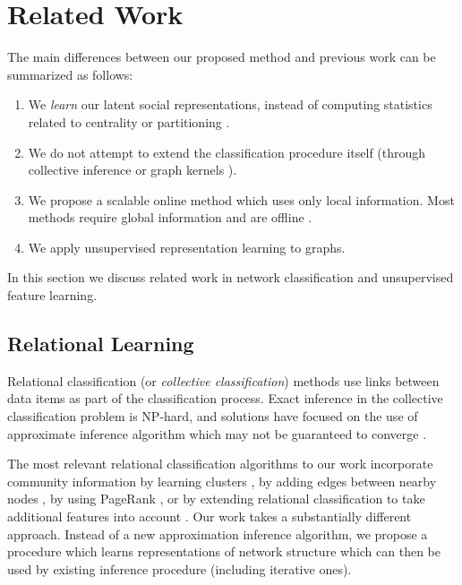 \documentclass{sig-alternate}
\begin{document}
\section{Related Work}
\label{sec:related}
The main differences between our proposed method and previous work can be summarized as follows: 
\begin{enumerate} [itemsep=0pt, topsep=5pt, partopsep=0pt]
\item We \emph{learn} our latent social representations, instead of computing statistics related to centrality \cite{gallagher2010leveraging} or partitioning \cite{Tang:2011:Leveraging}.
\item We do not attempt to extend the classification procedure itself (through collective inference \cite{sen2008collective} or graph kernels \cite{kondor2002diffusion}).
\item We propose a scalable online method which uses only local information.  Most methods require global information and are offline \cite{Tang:2009:RLV:1557019.1557109,tang2009scalable,Tang:2011:Leveraging,Henderson:2011:YKG:2020408.2020512}.
\item We apply unsupervised representation learning to graphs.
\end{enumerate}
In this section we discuss related work in network classification and unsupervised feature learning.

\subsection{Relational Learning}
Relational classification (or \emph{collective classification}) methods \cite{Macskassy03asimple,neville2000iterative,Pearl:1988:PRI:534975,geman1984stochastic} use links between data items as part of the classification process. 
Exact inference in the collective classification problem is NP-hard, and solutions have focused on the use of approximate inference algorithm which may not be guaranteed to converge \cite{sen2008collective}.

The most relevant relational classification algorithms to our work incorporate community information by learning clusters \cite{Neville:2005:LRA:1090193.1090201},  by adding edges between nearby nodes \cite{Gallagher:2008:UGE:1401890.1401925}, by using PageRank \cite{cohenASOM}, or by extending relational classification to take additional features into account \cite{wang2013multi}.
Our work takes a substantially different approach.  
Instead of a new approximation inference algorithm, we propose a procedure which learns representations of network structure which can then be used by existing inference procedure (including iterative ones).  
\end{document}
